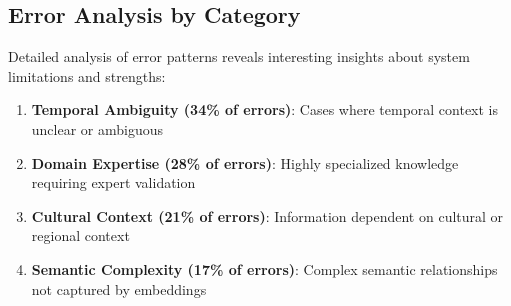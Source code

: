 \documentclass[12pt,a4paper]{article}
\begin{document}
\subsection{Error Analysis by Category}

Detailed analysis of error patterns reveals interesting insights about system limitations and strengths:

\begin{enumerate}
\item \textbf{Temporal Ambiguity (34\% of errors)}: Cases where temporal context is unclear or ambiguous
\item \textbf{Domain Expertise (28\% of errors)}: Highly specialized knowledge requiring expert validation
\item \textbf{Cultural Context (21\% of errors)}: Information dependent on cultural or regional context
\item \textbf{Semantic Complexity (17\% of errors)}: Complex semantic relationships not captured by embeddings
\end{enumerate}
\end{document}
